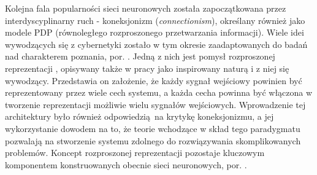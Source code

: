 \documentclass[12pt,a4paper,twoside]{article}
\begin{document}
Kolejna fala popularności sieci neuronowych została zapoczątkowana przez interdyscyplinarny ruch - koneksjonizm (\textit{connectionism}), określany również jako modele PDP (równoległego rozproszonego przetwarzania informacji). Wiele idei wywodzących się z cybernetyki zostało w tym okresie zaadaptowanych do badań nad charakterem poznania, por. \citet{touretzky1985}. Jedną z nich jest pomysł rozproszonej reprezentacji \citep{hinton1986}, opisywany także w pracy \citet{touretzky1985} jako inspirowany naturą i z niej się wywodzący. Przedstawia on założenie, że każdy sygnał wejściowy powinien być reprezentowany przez wiele cech systemu, a każda cecha powinna być włączona w tworzenie reprezentacji możliwie wielu sygnałów wejściowych. Wprowadzenie tej architektury było również odpowiedzią na krytykę koneksjonizmu, a jej wykorzystanie dowodem na to, że teorie wchodzące w skład tego paradygmatu pozwalają na stworzenie systemu zdolnego do rozwiązywania skomplikowanych problemów. Koncept rozproszonej reprezentacji pozostaje kluczowym komponentem konstruowanych obecnie sieci neuronowych, por. \citet{goodfellow2016}.
\end{document}

